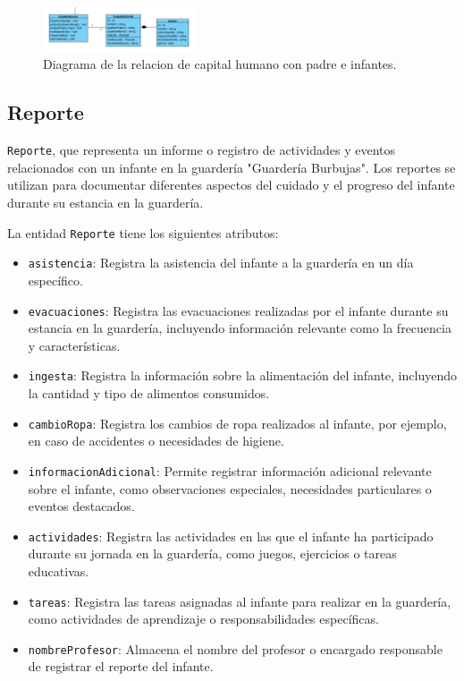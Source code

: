 \begin{figure}[htbp]
\centering
\includegraphics[width=0.4\textwidth]{images/arqui/capin.png}
\caption{Diagrama de la relacion de capital humano con padre e infantes.}
\label{fig:entidadpadin}
\end{figure}

\clearpage
\subsection{Reporte}


\texttt{Reporte}, que representa un informe o registro de actividades y eventos relacionados con un infante en la guardería "Guardería Burbujas". Los reportes se utilizan para documentar diferentes aspectos del cuidado y el progreso del infante durante su estancia en la guardería.

La entidad \texttt{Reporte} tiene los siguientes atributos:

\begin{itemize}
\item \texttt{asistencia}: Registra la asistencia del infante a la guardería en un día específico.
\item \texttt{evacuaciones}: Registra las evacuaciones realizadas por el infante durante su estancia en la guardería, incluyendo información relevante como la frecuencia y características.
\item \texttt{ingesta}: Registra la información sobre la alimentación del infante, incluyendo la cantidad y tipo de alimentos consumidos.
\item \texttt{cambioRopa}: Registra los cambios de ropa realizados al infante, por ejemplo, en caso de accidentes o necesidades de higiene.
\item \texttt{informacionAdicional}: Permite registrar información adicional relevante sobre el infante, como observaciones especiales, necesidades particulares o eventos destacados.
\item \texttt{actividades}: Registra las actividades en las que el infante ha participado durante su jornada en la guardería, como juegos, ejercicios o tareas educativas.
\item \texttt{tareas}: Registra las tareas asignadas al infante para realizar en la guardería, como actividades de aprendizaje o responsabilidades específicas.
\item \texttt{nombreProfesor}: Almacena el nombre del profesor o encargado responsable de registrar el reporte del infante.
\end{itemize}



